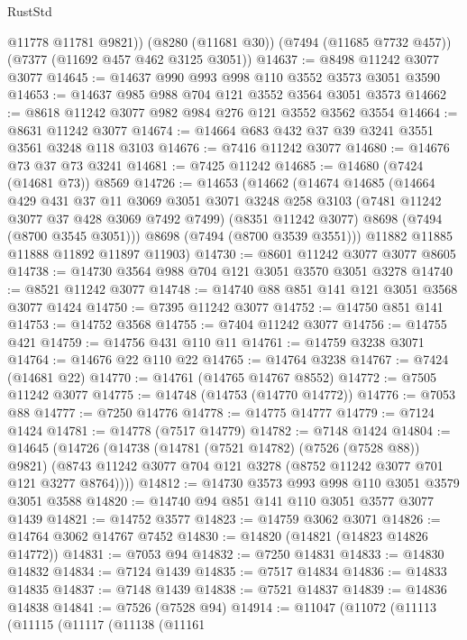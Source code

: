 \begin{lexlean}{RustStd}
\begin{coremodule}
{\begin{coremodule}
{{{{{{{{{{{{{{{{{{{{{{{{{{{{{{{{        @11778
        @11781
        @9821))
    (@8280 (@11681 @30))
    (@7494 (@11685 @7732 @457))
    (@7377 (@11692 @457 @462 @3125 @3051))
@14637 := @8498 @11242 @3077 @3077
@14645 := @14637 @990 @993 @998 @110 @3552 @3573 @3051 @3590
@14653 := @14637 @985 @988 @704 @121 @3552 @3564 @3051 @3573
@14662 := @8618 @11242 @3077 @982 @984 @276 @121 @3552 @3562 @3554
@14664 := @8631 @11242 @3077
@14674 := @14664 @683 @432 @37 @39 @3241 @3551 @3561 @3248 @118 @3103
@14676 := @7416 @11242 @3077
@14680 := @14676 @73 @37 @73 @3241
@14681 := @7425 @11242
@14685 := @14680 (@7424 (@14681 @73)) @8569
@14726 := @14653
    (@14662
      (@14674
        @14685
        (@14664
          @429
          @431
          @37
          @11
          @3069
          @3051
          @3071
          @3248
          @258
          @3103
          (@7481 @11242 @3077 @37 @428 @3069 @7492 @7499)
          (@8351 @11242 @3077)
          @8698
          (@7494 (@8700 @3545 @3051)))
        @8698
        (@7494 (@8700 @3539 @3551)))
      @11882
      @11885
      @11888
      @11892
      @11897
      @11903)
@14730 := @8601 @11242 @3077 @3077 @8605
@14738 := @14730 @3564 @988 @704 @121 @3051 @3570 @3051 @3278
@14740 := @8521 @11242 @3077
@14748 := @14740 @88 @851 @141 @121 @3051 @3568 @3077 @1424
@14750 := @7395 @11242 @3077
@14752 := @14750 @851 @141
@14753 := @14752 @3568
@14755 := @7404 @11242 @3077
@14756 := @14755 @421
@14759 := @14756 @431 @110 @11
@14761 := @14759 @3238 @3071
@14764 := @14676 @22 @110 @22
@14765 := @14764 @3238
@14767 := @7424 (@14681 @22)
@14770 := @14761 (@14765 @14767 @8552)
@14772 := @7505 @11242 @3077
@14775 := @14748 (@14753 (@14770 @14772))
@14776 := @7053 @88
@14777 := @7250 @14776
@14778 := @14775 @14777
@14779 := @7124 @1424
@14781 := @14778 (@7517 @14779)
@14782 := @7148 @1424
@14804 := @14645
    (@14726
      (@14738
        (@14781 (@7521 @14782) (@7526 (@7528 @88)) @9821)
        (@8743 @11242 @3077 @704 @121 @3278 (@8752 @11242 @3077 @701 @121 @3277 @8764))))
@14812 := @14730 @3573 @993 @998 @110 @3051 @3579 @3051 @3588
@14820 := @14740 @94 @851 @141 @110 @3051 @3577 @3077 @1439
@14821 := @14752 @3577
@14823 := @14759 @3062 @3071
@14826 := @14764 @3062 @14767 @7452
@14830 := @14820 (@14821 (@14823 @14826 @14772))
@14831 := @7053 @94
@14832 := @7250 @14831
@14833 := @14830 @14832
@14834 := @7124 @1439
@14835 := @7517 @14834
@14836 := @14833 @14835
@14837 := @7148 @1439
@14838 := @7521 @14837
@14839 := @14836 @14838
@14841 := @7526 (@7528 @94)
@14914 := @11047
    (@11072
      (@11113
        (@11115
          (@11117
            (@11138
              (@11161
}}}}}}}}}}}}}}}}}}}}}}}}}}}}}}}}
\end{coremodule}}
\end{coremodule}
\end{lexlean}
